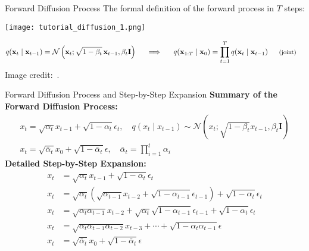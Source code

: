 \begin{refsection}
\begin{frame}{Forward Diffusion Process}
  \footnotesize
  The formal definition of the forward process in $T$ steps:
  \begin{center}
    \texttt{[image: tutorial\_diffusion\_1.png]}
  \end{center}
  \vspace{-1em}
    
    \begin{align*}
      q(\mathbf{x}_t \mid \mathbf{x}_{t-1}) &= \mathcal{N}\left(\mathbf{x}_t; \sqrt{1-\beta_t}\,\mathbf{x}_{t-1}, \beta_t \mathbf{I}\right)
      \hspace{1.5em}
      \Longrightarrow
      \hspace{1.5em}
      q(\mathbf{x}_{1:T} \mid \mathbf{x}_0) = \prod_{t=1}^T q(\mathbf{x}_t \mid \mathbf{x}_{t-1})
      \hspace{1.5em}
      \text{\footnotesize (joint)}
    \end{align*}
  \scriptsize Image credit:~\cite{CVPR2023Tutorial}.
  \bottomleftrefs
  
\end{frame}
\end{refsection}


\begin{frame}{Forward Diffusion Process and Step-by-Step Expansion}
  \textbf{Summary of the Forward Diffusion Process:}
  \begin{align*}
      x_t = \sqrt{\alpha_t} x_{t-1} + \sqrt{1 - \alpha_t} \epsilon_t, \quad q(x_t \mid x_{t-1}) \sim \mathcal{N}\left(x_t; \sqrt{1 - \beta_t} x_{t-1}, \beta_t \mathbf{I} \right) \\
      x_t = \sqrt{\bar{\alpha}_t} x_0 + \sqrt{1 - \bar{\alpha}_t} \epsilon, \quad \bar{\alpha}_t = \prod_{i=1}^{t} \alpha_i
  \end{align*}
  \vspace{1em}
  \textbf{Detailed Step-by-Step Expansion:}
  \begin{align*}
      x_t &= \sqrt{\alpha_t} x_{t-1} + \sqrt{1 - \alpha_t} \epsilon_t \\
      x_t &= \sqrt{\alpha_t} \left( \sqrt{\alpha_{t-1}} x_{t-2} + \sqrt{1 - \alpha_{t-1}} \epsilon_{t-1} \right) + \sqrt{1 - \alpha_t} \epsilon_t \\
      x_t &= \sqrt{\alpha_t \alpha_{t-1}} x_{t-2} + \sqrt{\alpha_t} \sqrt{1 - \alpha_{t-1}} \epsilon_{t-1} + \sqrt{1 - \alpha_t} \epsilon_t \\
      x_t &= \sqrt{\alpha_t \alpha_{t-1} \alpha_{t-2}} x_{t-3} + \cdots + \sqrt{1 - \alpha_t \alpha_{t-1}} \epsilon \\
      x_t &= \sqrt{\bar{\alpha}_t} x_0 + \sqrt{1 - \bar{\alpha}_t} \epsilon \\
  \end{align*}
\end{frame}


